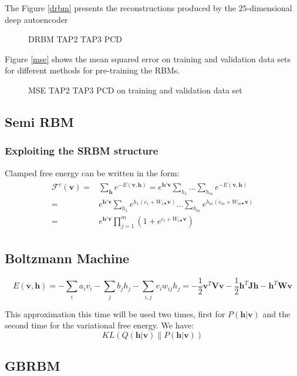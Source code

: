 \documentclass[../report/report.tex]{subfiles}
\begin{document}
The Figure \ref{drbm} presents the reconstructions produced
by the $25$-dimensional deep autoencoder

\begin{figure}[!htb]
\label{fig:drbm}
  \caption[1]{DRBM TAP2 TAP3 PCD}
\end{figure}

Figure \ref{mse} shows the mean squared error on training and validation data sets for different methods for pre-training the RBMs.

\begin{figure}[!htb]
\label{fig:mse}
  \caption[1]{MSE TAP2 TAP3 PCD on training and validation data set}
\end{figure}
\subsection{Semi RBM}

\subsubsection{Exploiting the SRBM structure}

Clamped free energy can be written in the form:
\begin{align}
\begin{split}
\mathcal{F}^c(\mathbf{v}) = & \sum_\mathbf{h} e^{-E(\mathbf{v}, \mathbf{h})} = e^{\mathbf{b}'\mathbf{v}}\sum_{h_1}...\sum_{h_m}e^{-E(\mathbf{v}, \mathbf{h})} \\
=&  e^{\mathbf{b}'\mathbf{v}} \sum_{h_1} e^{h_1 (c_1 + W_{1\bullet}\mathbf{v})}... \sum_{h_m} e^{h_m (c_m + W_{m\bullet}\mathbf{v})} \\
= & e^{\mathbf{b}'\mathbf{v}} \prod_{j=1}^{m} \left( 1 + e^{c_i + W_{i\bullet}\mathbf{v}} \right)
\label{eq:freeEnergy}
\end{split}
\end{align}
\subsection{Boltzmann Machine}
$$ E (\mathbf{v,h}) = - \sum_i a_i v_i - \sum_j b_j h_j - \sum_{i,j} v_i w_{ij}h_j = -\frac{1}{2} \mathbf{v}^T \mathbf{V}  \mathbf{v} - \frac{1}{2} \mathbf{h}^T  \mathbf{J} \mathbf{h} - \mathbf{h}^T \mathbf{W}  \mathbf{v} $$

This approximation this time will be used two times, first for $P(\mathbf{h}| \mathbf{v})$ and the second time for the variational free energy.
We have:
$$ KL \left(Q(\mathbf{h}| \mathbf{v}) \| P(\mathbf{h}| \mathbf{v}) \right)$$


\subsection{GBRBM}
\end{document}
